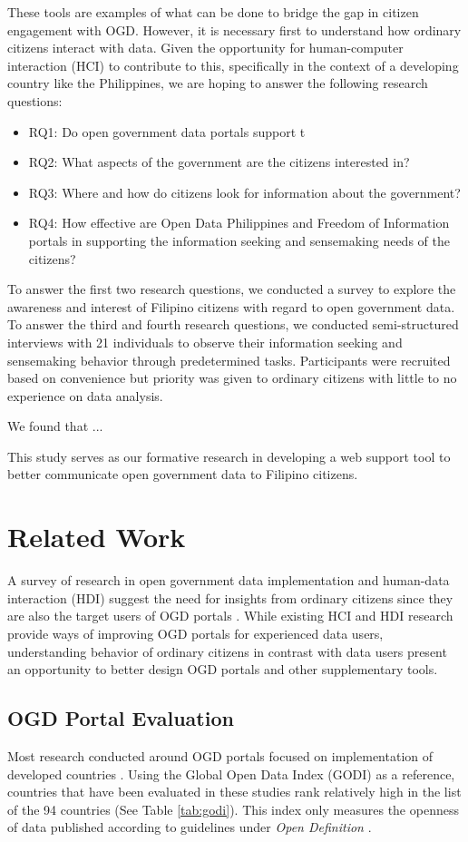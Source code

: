 \documentclass{sigchi}
\begin{document}
These tools are examples of what can be done to bridge the gap in citizen engagement with OGD. However, it is necessary first to understand how ordinary citizens interact with data. Given the opportunity for human-computer interaction (HCI) to contribute to this, specifically in the context of a developing country like the Philippines, we are hoping to answer the following research questions:
\begin{itemize}
    \item RQ1: Do open government data portals support t
    \item RQ2: What aspects of the government are the citizens interested in?
    \item RQ3: Where and how do citizens look for information about the government?
    \item RQ4: How effective are Open Data Philippines and Freedom of Information portals in supporting the information seeking and sensemaking needs of the citizens?
\end{itemize}

To answer the first two research questions, we conducted a survey to explore the awareness and interest of Filipino citizens with regard to open government data. To answer the third and fourth research questions, we conducted semi-structured interviews with 21 individuals to observe their information seeking and sensemaking behavior through predetermined tasks. Participants were recruited based on convenience but priority was given to ordinary citizens with little to no experience on data analysis.

We found that ...

This study serves as our formative research in developing a web support tool to better communicate open government data to Filipino citizens.


\section{Related Work}
A survey of research in open government data implementation and human-data interaction (HDI) suggest the need for insights from ordinary citizens since they are also the target users of OGD portals \cite{warwick2017}. While existing HCI and HDI research provide ways of improving OGD portals for experienced data users, understanding behavior of ordinary citizens in contrast with data users present an opportunity to better design OGD portals and other supplementary tools. 

\subsection{OGD Portal Evaluation}
Most research conducted around OGD portals focused on implementation of developed countries \cite{kacprzak2019characterising, klimek2019dcat, koesten2019collaborative,Parycek2014}. Using the Global Open Data Index (GODI) as a reference, countries that have been evaluated in these studies rank relatively high in the list of the 94 countries (See Table \ref{tab:godi})\cite{godimetric2016}. This index only measures the openness of data published according to guidelines under \textit{Open Definition} \cite{godimetric2016}. 
\end{document}
